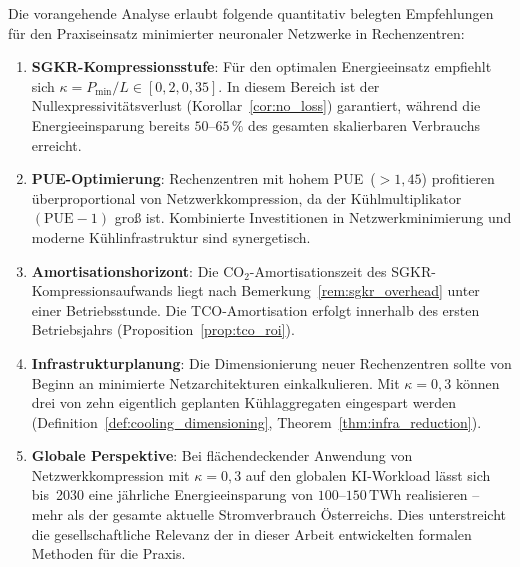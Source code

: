 ﻿\documentclass[12pt, a4paper, openany]{report}
\begin{document}
Die vorangehende Analyse erlaubt folgende quantitativ belegten Empfehlungen
für den Praxiseinsatz minimierter neuronaler Netzwerke in Rechenzentren:

\begin{enumerate}[label=(\arabic*)]
  \item \textbf{SGKR-Kompressionsstufe}: Für den optimalen
    Energieeinsatz empfiehlt sich $\kappa = P_{\min}/L \in [0{,}2, 0{,}35]$.
    In diesem Bereich ist der Nullexpressivitätsverlust (Korollar~\ref{cor:no_loss})
    garantiert, während die Energieeinsparung bereits $50$--$65\,\%$ des
    gesamten skalierbaren Verbrauchs erreicht.

  \item \textbf{PUE-Optimierung}: Rechenzentren mit hohem PUE~($>1{,}45$)
    profitieren überproportional von Netzwerkkompression, da der
    Kühlmultiplikator $(\mathrm{PUE}-1)$ groß ist.  Kombinierte
    Investitionen in Netzwerkminimierung und moderne Kühlinfrastruktur
    sind synergetisch.

  \item \textbf{Amortisationshorizont}: Die CO$_2$-Amortisa\-tionszeit
    des SGKR-Kompressions\-aufwands liegt nach
    Bemerkung~\ref{rem:sgkr_overhead} unter einer Betriebsstunde.
    Die TCO-Amortisa\-tion erfolgt innerhalb des ersten Betriebsjahrs
    (Proposition~\ref{prop:tco_roi}).

  \item \textbf{Infrastrukturplanung}: Die Dimensionierung neuer
    Rechenzentren sollte von Beginn an minimierte Netzarchitekturen
    einkalkulieren.  Mit $\kappa = 0{,}3$ können drei von zehn
    eigentlich geplanten Kühlaggregaten eingespart werden
    (Definition~\ref{def:cooling_dimensioning}, Theorem~\ref{thm:infra_reduction}).

  \item \textbf{Globale Perspektive}: Bei flächendeckender Anwendung von
    Netzwerkkompression mit $\kappa = 0{,}3$ auf den globalen KI-Workload
    lässt sich bis~2030 eine jährliche Energieeinsparung von
    $100$--$150\,\mathrm{TWh}$ realisieren -- mehr als der gesamte aktuelle
    Stromverbrauch Österreichs.  Dies unterstreicht die gesellschaftliche
    Relevanz der in dieser Arbeit entwickelten formalen Methoden für die
    Praxis.
\end{enumerate}

\end{document}
